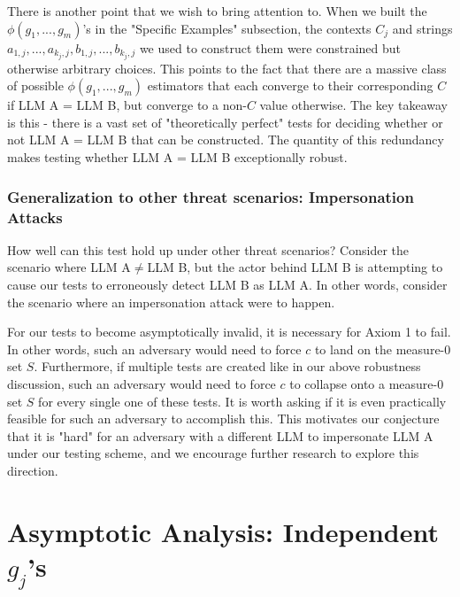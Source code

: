 \documentclass{article}
\begin{document}
There is another point that we wish to bring attention to. When we built the $\displaystyle \phi \left( g_{1} ,...,g_{m}\right)$'s in the "Specific Examples" subsection, the contexts $\displaystyle C_{j}$ and strings $\displaystyle a_{1,j} ,...,a_{k_{j} ,j} ,b_{1,j} ,...,b_{k_{j} ,j}$ we used to construct them were constrained but otherwise arbitrary choices. This points to the fact that there are a massive class of possible $\displaystyle \phi \left( g_{1} ,...,g_{m}\right)$ estimators that each converge to their corresponding $\displaystyle C$ if LLM A = LLM B, but converge to a non-$\displaystyle C$ value otherwise. The key takeaway is this - there is a vast set of "theoretically perfect" tests for deciding whether or not LLM A = LLM B that can be constructed. The quantity of this redundancy makes testing whether LLM A = LLM B exceptionally robust.



\subsubsection{Generalization to other threat scenarios: Impersonation Attacks}

How well can this test hold up under other threat scenarios? Consider the scenario where LLM A$\displaystyle \neq $LLM B, but the actor behind LLM B is attempting to cause our tests to erroneously detect LLM B as LLM A. In other words, consider the scenario where an impersonation attack were to happen.



For our tests to become asymptotically invalid, it is necessary for Axiom 1 to fail. In other words, such an adversary would need to force $\displaystyle c$ to land on the measure-0 set $\displaystyle S$. Furthermore, if multiple tests are created like in our above robustness discussion, such an adversary would need to force $\displaystyle c$ to collapse onto a measure-0 set $\displaystyle S$ for every single one of these tests. It is worth asking if it is even practically feasible for such an adversary to accomplish this. This motivates our conjecture that it is "hard" for an adversary with a different LLM to impersonate LLM A under our testing scheme, and we encourage further research to explore this direction.



\section{Asymptotic Analysis: Independent $\displaystyle g_{j}$'s}
\end{document}
